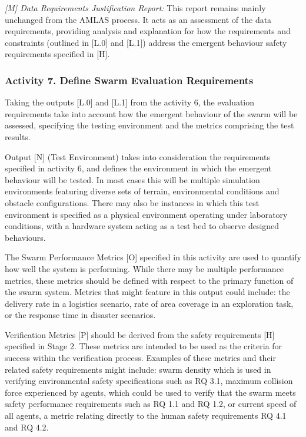 \documentclass[runningheads]{llncs}
\begin{document}
\emph{[M] Data Requirements Justification Report:}
This report remains mainly unchanged from the AMLAS process. It acts as an assessment of the data requirements, providing analysis and explanation for how the requirements and constraints (outlined in [L.0] and [L.1]) address the emergent behaviour safety requirements specified in [H].

\vspace{-2ex}
\subsubsection*{Activity 7. Define Swarm Evaluation Requirements}

Taking the outputs [L.0] and [L.1] from the activity 6, the evaluation requirements take into account how the emergent behaviour of the swarm will be assessed, specifying the testing environment and the metrics comprising the test results.  

Output [N] (Test Environment) takes into consideration the requirements specified in activity 6, and defines the environment in which the emergent behaviour will be tested. In most cases this will be multiple simulation environments featuring diverse sets of terrain, environmental conditions and obstacle configurations. There may also be instances in which this test environment is specified as a physical environment operating under laboratory conditions, with a hardware system acting as a test bed to observe designed behaviours.

The Swarm Performance Metrics [O] specified in this activity are used to quantify how well the system is performing. While there may be multiple performance metrics, these metrics should be defined with respect to the primary function of the swarm system. Metrics that might feature in this output could include: the delivery rate in a logistics scenario, rate of area coverage in an exploration task, or the response time in disaster scenarios.

Verification Metrics [P] should be derived from the safety requirements [H] specified in Stage 2. These metrics are intended to be used as the criteria for success within the verification process. Examples of these metrics and their related safety requirements might include: swarm density which is used in verifying environmental safety specifications such as RQ 3.1, maximum collision force experienced by agents, which could be used to verify that the swarm meets safety performance requirements such as RQ 1.1 and RQ 1.2, or current speed of all agents, a metric relating directly to the human safety requirements RQ 4.1 and RQ 4.2.
\end{document}
